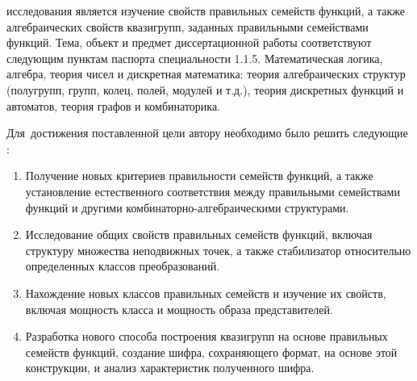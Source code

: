 \ifsynopsis
\else
\fi

{\aim} исследования является изучение свойств правильных семейств функций, а также алгебраических свойств квазигрупп, заданных правильными семействами функций.
Тема, объект и предмет диссертационной работы соответствуют следующим пунктам паспорта специальности 1.1.5. Математическая логика, алгебра, теория чисел и дискретная математика: теория алгебраических структур (полугрупп, групп, колец, полей, модулей и т.д.), теория дискретных функций и автоматов, теория графов и комбинаторика. 


Для~достижения поставленной цели автору необходимо было решить следующие {\tasks}:
\begin{enumerate}[beginpenalty=10000] %
    \item Получение новых критериев правильности семейств функций, а также установление естественного соответствия между правильными семействами функций и другими комбинаторно-алгебраическими структурами.
    \item Исследование общих свойств правильных семейств функций, включая структуру множества неподвижных точек, а также стабилизатор относительно определенных классов преобразований.
    \item Нахождение новых классов правильных семейств и изучение их свойств, включая мощность класса и мощность образа представителей.
    \item Разработка нового способа построения квазигрупп на основе правильных семейств функций, создание шифра, сохраняющего формат, на основе этой конструкции, и анализ характеристик полученного шифра.
\end{enumerate}


